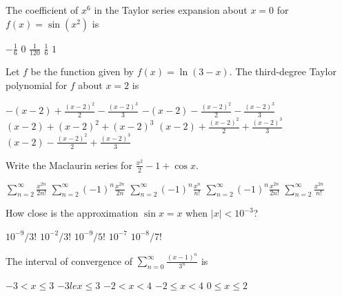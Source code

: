 \begin{questions}
\question[2] The coefficient of $x^6$ in the Taylor series expansion
    about $x = 0$ for $f(x) = \sin (x^2)$ is

    \begin{oneparchoices}
    \CorrectChoice $-\frac{1}{6}$
    \choice $0$
    \choice $\frac{1}{120}$
    \choice $\frac{1}{6}$
    \choice $1$
    \end{oneparchoices}

\question[2] Let $f$ be the function given by $f(x) = \ln(3 - x)$. The
    third-degree Taylor polynomial for $f$ about $x = 2$ is
    
    \begin{oneparchoices}
    \choice $-(x-2) + \frac{(x-2)^2}{2} - \frac{(x-2)^3}{3}$
    \CorrectChoice $-(x-2) - \frac{(x-2)^2}{2} - \frac{(x-2)^3}{3}$
    \choice $(x-2) + (x-2)^2 + (x-2)^3$
    \choice $(x-2) + \frac{(x-2)^2}{2} + \frac{(x-2)^3}{3}$
    \choice $(x-2) - \frac{(x-2)^2}{2} + \frac{(x-2)^3}{3}$
    \end{oneparchoices}

\question[2] Write the Maclaurin series for $\frac{x^2}{2} - 1 + \cos x$.
    
    \begin{oneparchoices}
    \choice $\sum_{n=2}^\infty \frac{x^{2n}}{2n!}$ 
    \choice $\sum_{n=2}^\infty (-1)^n \frac{x^{2n}}{2n}$ 
    \choice $\sum_{n=2}^\infty (-1)^n \frac{x^{n}}{n!}$ 
    \CorrectChoice $\sum_{n=2}^\infty (-1)^n \frac{x^{2n}}{2n!}$ 
    \choice $\sum_{n=2}^\infty \frac{x^{2n}}{n!}$ 
    \end{oneparchoices}

\question[2] How close is the approximation $\sin x = x$ when $|x| < 10^{-3}$?
    
    \begin{oneparchoices}
    \CorrectChoice $10^{-9}/3!$
    \choice $10^{-2}/3!$
    \choice $10^{-9}/5!$
    \choice $10^{-7}$
    \choice $10^{-8}/7!$
    \end{oneparchoices}


\question[2] The interval of convergence of $\sum_{n =
    0}^\infty \frac{ (x-1)^n }{3^n}$ is

    \begin{oneparchoices}
    \choice $-3 < x \le 3$
    \choice $-3 le x \le 3$
    \CorrectChoice $-2 < x < 4$
    \choice $-2 \le x < 4$
    \choice $0 \le x \le 2$
    \end{oneparchoices}


\end{questions}
